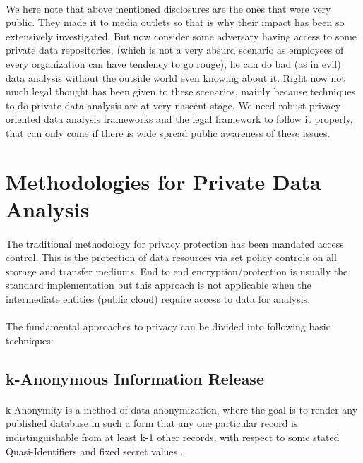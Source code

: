 \documentclass[12pt]{report}
\theoremstyle{named}
\begin{document}
\paragraph{}
We here note that above mentioned disclosures are the ones that were very public. They made it to media outlets so that is why their impact has been so extensively investigated. But now consider some adversary having access to some private data repositories, (which is not a very absurd scenario as employees of every organization can have tendency to go rouge), he can do bad (as in evil) data analysis without the outside world even knowing about it. Right now not much legal thought has been given to these scenarios, mainly because techniques to do private data analysis are at very nascent stage. We need robust privacy oriented data analysis frameworks and the legal framework to follow it properly, that can only come if there is wide spread public awareness of these issues.





\section{Methodologies for Private Data Analysis}
\paragraph{}
The traditional methodology for privacy protection has been mandated access control. This is the protection of data resources via set policy controls on all storage and transfer mediums. End to end encryption/protection is usually the standard implementation but this approach is not applicable when the intermediate entities (public cloud) require access to data for analysis.
\paragraph{}
The fundamental approaches to privacy can be divided into following basic techniques:


\subsection{k-Anonymous Information Release}
\paragraph{}
k-Anonymity \cite{sweeney2002k} is a method of data anonymization, where the goal is to render any published database in such a form that any one particular record is indistinguishable from at least k-1 other records, with respect to some stated Quasi-Identifiers and fixed secret values \cite{dalenius1986finding}.
\end{document}
